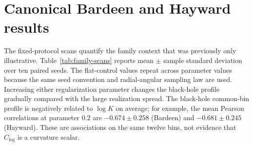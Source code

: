 \documentclass[11pt]{article}
\newcommand{\clog}{C_{\log}}
\newcommand{\drho}{\Delta\rho_r}
\begin{document}
\begin{table}[H]
\centering
\caption{Selected paired contrasts in $|\drho|$. The contrast is protocol A
minus protocol B; intervals are two-sided Student-$t$ intervals over ten paired
seeds.}
\label{tab:paired-contrasts}
\small
{}
\end{table}

\section{Canonical Bardeen and Hayward results}

The fixed-protocol scans quantify the family context that was previously only
illustrative. Table~\ref{tab:family-scans} reports mean $\pm$ sample standard
deviation over ten paired seeds. The flat-control values repeat across parameter
values because the same seed convention and radial-angular sampling law are
used. Increasing either regularization parameter changes the black-hole profile
gradually compared with the large realization spread. The black-hole common-bin
profile is negatively related to $\log K$ on average; for example, the mean
Pearson correlations at parameter $0.2$ are $-0.674\pm0.258$ (Bardeen) and
$-0.681\pm0.245$ (Hayward). These are associations on the same twelve bins, not
evidence that $\clog$ is a curvature scalar.
\end{document}
